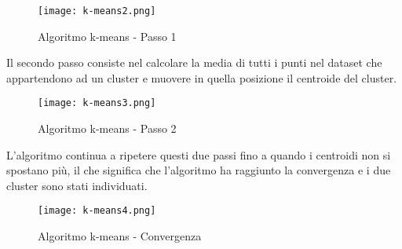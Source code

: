 \documentclass[../main.tex]{subfiles}
\begin{document}
\begin{figure}[H]
				\centering
				\texttt{[image: k-means2.png]}
				\caption{Algoritmo k-means - Passo 1}
\end{figure}

Il secondo passo consiste nel calcolare la media di tutti i punti nel dataset che appartendono ad un cluster e muovere in quella posizione il centroide del cluster.

\begin{figure}[H]
				\centering
				\texttt{[image: k-means3.png]}
				\caption{Algoritmo k-means - Passo 2}
\end{figure}

L'algoritmo continua a ripetere questi due passi fino a quando i centroidi non si spostano più, il che significa che l'algoritmo ha raggiunto la convergenza e i due cluster sono stati individuati.

\begin{figure}[H]
				\centering
				\texttt{[image: k-means4.png]}
				\caption{Algoritmo k-means - Convergenza}
\end{figure}
\end{document}
